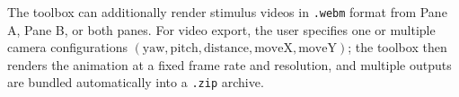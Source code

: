 The toolbox can additionally render stimulus videos in \texttt{.webm} format from Pane A, Pane B, or both panes. For video export, the user specifies one or multiple camera configurations $(\mathrm{yaw},\mathrm{pitch},\mathrm{distance},\mathrm{moveX},\mathrm{moveY})$; the toolbox then renders the animation at a fixed frame rate and resolution, and multiple outputs are bundled automatically into a \texttt{.zip} archive.
